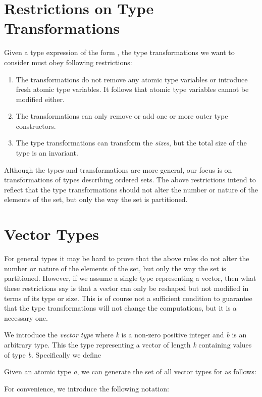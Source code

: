 \documentclass{article}
\begin{document}
\section{Restrictions on Type Transformations\label{Restrictions-on-Type}}

Given a type expression of the form ,
the type transformations we want to consider must obey following restrictions:
\begin{enumerate}
\item The transformations do not remove any atomic type variables or introduce
fresh atomic type variables. It follows that atomic type variables
cannot be modified either. 
\item The transformations can only remove or add one or more outer type
constructors. 
\item The type transformations can transform the \emph{sizes}, but the total
size of the type is an invariant. 
\end{enumerate}
Although the types and transformations are more general, our focus
is on transformations of types describing ordered sets. The above
restrictions intend to reflect that the type transformations should
not alter the number or nature of the elements of the set, but only
the way the set is partitioned. 


\section{Vector Types}

For general types  it may be hard to prove that the above
rules do not alter the number or nature of the elements of the set,
but only the way the set is partitioned. However, if we assume a single
type representing a vector, then what these restrictions say is that
a vector can only be reshaped but not modified in terms of its type
or size. This is of course not a sufficient condition to guarantee
that the type transformations will not change the computations, but
it is a necessary one.

We introduce the \emph{vector type}  where \emph{k}
is a non-zero positive integer and \emph{b} is an arbitrary type.
This the type representing a vector of length \emph{k} containing
values of type \emph{b}. Specifically we define




Given an atomic type \emph{a}, we can generate the set of all vector
types  for  as follows:




For convenience, we introduce the following notation: 
\end{document}

